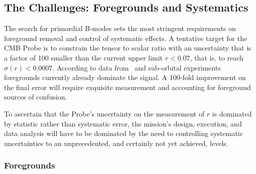 \subsection{The Challenges: Foregrounds and Systematics}
\label{sec:foregrounds_systematics}

\vspace{-0.05in}
The search for primordial B-modes sets the most stringent requirements on foreground removal and control of systematic effects. A tentative target for the CMB Probe is to constrain the tensor to scalar ratio with an 
uncertainty that is a factor of 100 smaller than the current upper limit \mbox{$r < 0.07$}, that is, to reach 
$\sigma(r) <0.0007$. According to data from \planck\ and 
sub-orbital experiments foregrounds currently already dominate the signal. A 100-fold improvement 
on the final error will require exquisite measurement and accounting for foreground sources 
of confusion. 

To ascertain that the Probe's uncertainty on the measurement of $r$ is dominated by statistic rather than 
systematic error, the mission's design, execution, and data analysis will have to be dominated by the need
to controlling systematic uncertainties to an unprecedented, and certainly not yet achieved, levels. 

\vspace{-0.18in}

\subsubsection{Foregrounds}
\label{sec:foregrounds}

\vspace{-0.05in}


